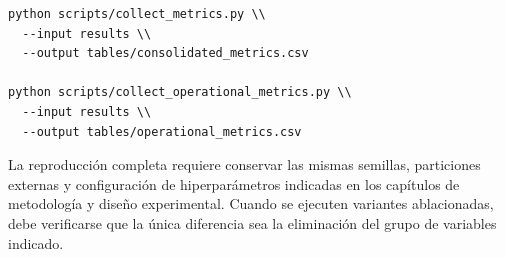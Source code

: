 \documentclass[12pt,oneside]{report}
\begin{document}
\begin{verbatim}
python scripts/collect_metrics.py \\
  --input results \\
  --output tables/consolidated_metrics.csv

python scripts/collect_operational_metrics.py \\
  --input results \\
  --output tables/operational_metrics.csv
\end{verbatim}

La reproducción completa requiere conservar las mismas semillas, particiones externas y configuración de hiperparámetros indicadas en los capítulos de metodología y diseño experimental. Cuando se ejecuten variantes ablacionadas, debe verificarse que la única diferencia sea la eliminación del grupo de variables indicado.
\end{document}
